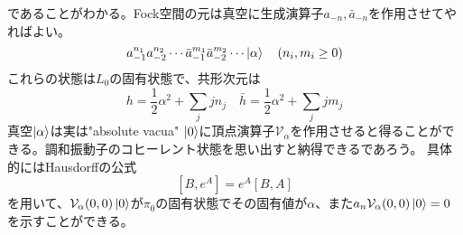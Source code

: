 \documentclass[11pt, aps, longbibliography]{article}
\numberwithin{equation}{section}
\begin{document}
        であることがわかる。Fock空間の元は真空に生成演算子$a_{-n}, \bar{a}_{-n}$を作用させてやればよい。
        \begin{equation}\label{eq:freeboson3-5}
            a_{-1}^{n_1}a_{-2}^{n_2}\cdots \bar{a}_{-1}^{m_1}\bar{a}_{-2}^{m_2} \cdots \ket{\alpha} \quad (n_i,m_i \geq0)
        \end{equation}
        これらの状態は$L_0$の固有状態で、共形次元は
        \begin{equation}\label{eq:freeboson3-6}
            h = \frac{1}{2}\alpha^2 + \sum_{j}jn_j \quad \bar{h} = \frac{1}{2}\alpha^2 + \sum_{j}jm_j
        \end{equation}
        真空$\ket{\alpha}$は実は"absolute vacua" $\ket{0}$に頂点演算子$\mathcal{V}_\alpha$を作用させると得ることができる。調和振動子のコヒーレント状態を思い出すと納得できるであろう。
        具体的にはHausdorffの公式
        \begin{equation}\label{eq:freeboson3-7}
            [B,e^A] = e^A[B,A]
        \end{equation}
        を用いて、$\mathcal{V}_\alpha(0,0)\ket{0}$が$\pi_0$の固有状態でその固有値が$\alpha$、また$a_n\mathcal{V}_\alpha(0,0)\ket{0}=0$を示すことができる。
\end{document}
